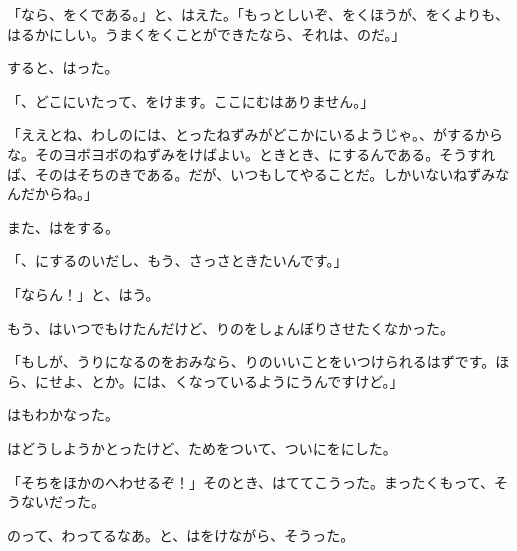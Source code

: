 「なら、をくである。」と、はえた。「もっとしいぞ、をくほうが、をくよりも、はるかにしい。うまくをくことができたなら、それは、のだ。」

すると、はった。

「、どこにいたって、をけます。ここにむはありません。」

「ええとね、わしのには、とったねずみがどこかにいるようじゃ。、がするからな。そのヨボヨボのねずみをけばよい。ときとき、にするんである。そうすれば、そのはそちのきである。だが、いつもしてやることだ。しかいないねずみなんだからね。」

また、はをする。

「、にするのいだし、もう、さっさときたいんです。」

「ならん！」と、はう。

もう、はいつでもけたんだけど、りのをしょんぼりさせたくなかった。

「もしが、うりになるのをおみなら、りのいいことをいつけられるはずです。ほら、にせよ、とか。には、くなっているようにうんですけど。」

はもわかなった。

はどうしようかとったけど、ためをついて、ついにをにした。

「そちをほかのへわせるぞ！」そのとき、はててこうった。まったくもって、そうないだった。

のって、わってるなあ。と、はをけながら、そうった。


